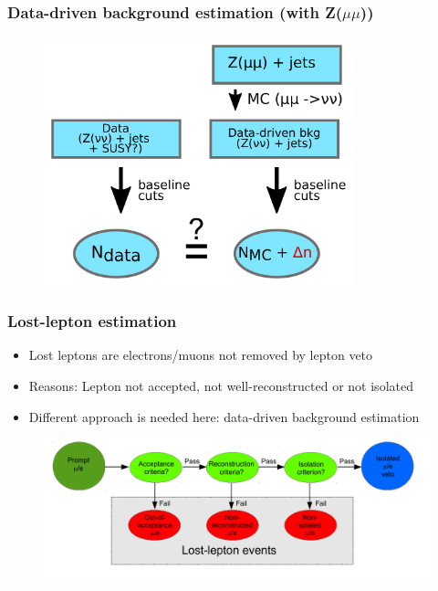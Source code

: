\begin{frame}
  \frametitle{Data-driven background estimation (with Z($\mu\mu$))}
  \begin{figure}[H]
    \centering
    \includegraphics[width=0.8\textwidth,height=0.8\textheight,keepaspectratio]{figures/ddbe_zmumu}
  \end{figure}
\end{frame}

\begin{frame}
  \frametitle{Lost-lepton estimation}
  \begin{itemize}
    \item Lost leptons are electrons/muons not removed by lepton veto
    \item Reasons: Lepton not accepted, not well-reconstructed or not isolated
    \item Different approach is needed here: data-driven background estimation
  \end{itemize}

  \begin{figure}[H]
    \centering
     \includegraphics[width=\textwidth]{figures/lost-lepton.png}
  \end{figure}

\end{frame}

